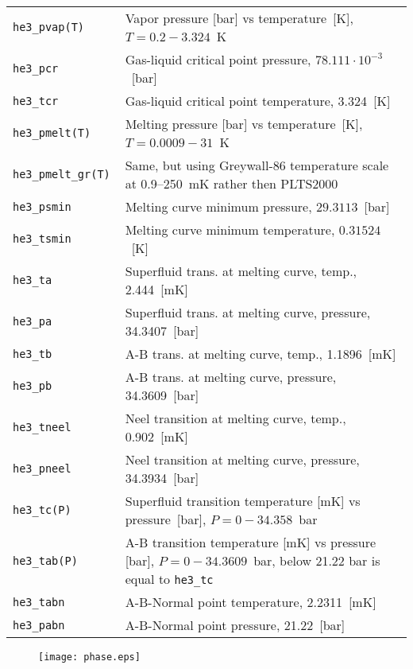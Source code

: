 \documentclass[a4paper]{article}
\begin{document}
\medskip
\begin{tabular}{lp{9cm}}
\tt he3\_pvap(T)  & Vapor pressure [bar] vs temperature~[K],\newline
                    $ T = 0.2 - 3.324$~K \\
\tt he3\_pcr      & Gas-liquid critical point pressure, $78.111\cdot 10^{-3}$~[bar] \\
\tt he3\_tcr      & Gas-liquid critical point temperature, 3.324~[K] \\
\tt he3\_pmelt(T) & Melting pressure [bar] vs temperature~[K],\newline
                    $ T = 0.0009 - 31$~K\\
\tt he3\_pmelt\_gr(T) & Same, but using Greywall-86 temperature scale at
                    0.9--250~mK rather then PLTS2000\\
\tt he3\_psmin    & Melting curve minimum pressure, $29.3113$~[bar]\\
\tt he3\_tsmin    & Melting curve minimum temperature, $0.31524$~[K]\\
\tt he3\_ta       & Superfluid trans. at melting curve, temp., 2.444~[mK]\\
\tt he3\_pa       & Superfluid trans. at melting curve, pressure, 34.3407~[bar]\\
\tt he3\_tb       & A-B trans. at melting curve, temp., 1.1896~[mK]\\
\tt he3\_pb       & A-B trans. at melting curve, pressure, 34.3609~[bar]\\
\tt he3\_tneel    & Neel transition at melting curve, temp., 0.902~[mK]\\
\tt he3\_pneel    & Neel transition at melting curve, pressure, 34.3934~[bar]\\
\tt he3\_tc(P)    & Superfluid transition temperature [mK] vs pressure~[bar],\newline
                    $ P = 0 - 34.358 $~bar\\
\tt he3\_tab(P)   & A-B transition temperature [mK] vs pressure [bar],\newline
                    $ P = 0 - 34.3609 $~bar, below 21.22 bar is equal to {\tt he3\_tc}\\
\tt he3\_tabn     & A-B-Normal point temperature, 2.2311~[mK]\\
\tt he3\_pabn     & A-B-Normal point pressure, 21.22~[bar]\\
\end{tabular}

\eject

\begin{figure}[h]
\texttt{[image: phase.eps]}
\end{figure}
\end{document}
